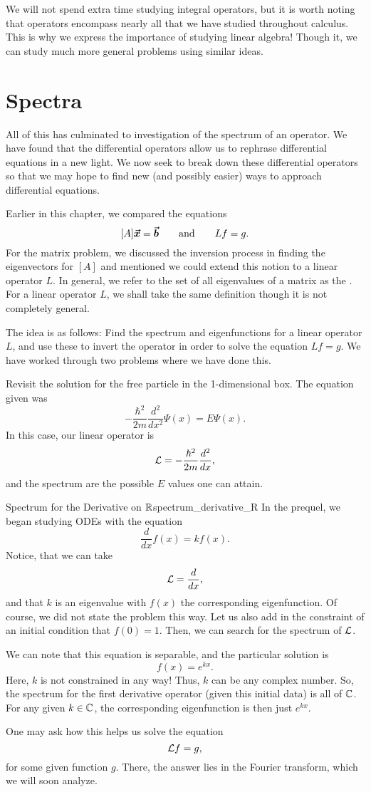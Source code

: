 We will not spend extra time studying integral operators, but it is worth noting that operators encompass nearly all that we have studied throughout calculus.  This is why we express the importance of studying linear algebra! Though it, we can study much more general problems using similar ideas.

\section{Spectra}

All of this has culminated to investigation of the spectrum of an operator. We have found that the differential operators allow us to rephrase differential equations in a new light. We now seek to break down these differential operators so that we may hope to find new (and possibly easier) ways to approach differential equations.

Earlier in this chapter, we compared the equations
\[
[A]\boldsymbol{\vec{x}} = \boldsymbol{\vec{b}} \qquad \textrm{and} \qquad Lf=g.
\]
For the matrix problem, we discussed the inversion process in finding the eigenvectors for $[A]$ and mentioned we could extend this notion to a linear operator $L$.  In general, we refer to the set of all eigenvalues of a matrix as the . For a linear operator $L$, we shall take the same definition though it is not completely general.

The idea is as follows: Find the spectrum and eigenfunctions for a linear operator $L$, and use these to invert the operator in order to solve the equation $Lf=g$. We have worked through two problems where we have done this.  

\begin{exercise}
	Revisit the solution for the free particle in the 1-dimensional box.  The equation given was 
	\[
	-\frac{\hbar^2}{2m}\frac{d^2}{dx^2}\Psi(x) = E \Psi(x).
	\]
	In this case, our linear operator is 
	\[
	\mathcal{L}=-\frac{\hbar^2}{2m}\frac{d^2}{dx},
	\]
	and the spectrum are the possible $E$ values one can attain. 
\end{exercise}

\begin{ex}{Spectrum for the Derivative on $\mathbb{R}$}{spectrum_derivative_R}
	In the prequel, we began studying ODEs with the equation
	\[
	\frac{d}{dx}f(x) = kf(x).
	\]
	Notice, that we can take
	\[
	\mathcal{L} = \frac{d}{dx},
	\]
	and that $k$ is an eigenvalue with $f(x)$ the corresponding eigenfunction.  Of course, we did not state the problem this way. Let us also add in the constraint of an initial condition that $f(0)=1$.  Then, we can search for the spectrum of $\mathcal{L}$.
	
	We can note that this equation is separable, and the particular solution is 
	\[
	f(x) = e^{kx}.
	\]
	Here, $k$ is not constrained in any way! Thus, $k$ can be any complex number.  So, the spectrum for the first derivative operator (given this initial data) is all of $\mathbb{C}$.  For any given $k\in \mathbb{C}$, the corresponding eigenfunction is then just $e^{kx}$.
	
	One may ask how this helps us solve the equation
	\[
	\mathcal{L} f = g,
	\]
	for some given function $g$.  There, the answer lies in the Fourier transform, which we will soon analyze.  
\end{ex}


